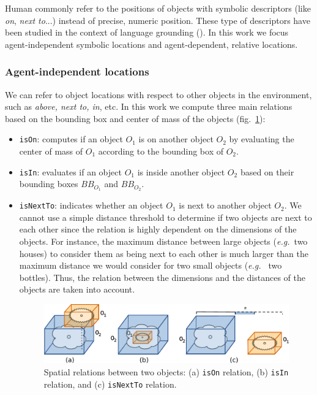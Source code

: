 \documentclass{svmult}
\newcommand{\concept}[1]{{\footnotesize \texttt{#1}}}
\newcommand{\eg}{{\textit{e.g.~}}}
\begin{document}
Human commonly refer to the positions of objects with symbolic descriptors
(like \emph{on}, \emph{next to}...) instead of precise, numeric position. These
type of descriptors have been studied in the context of language grounding
(\cite{O'Keefe1999,Matuszek2010,Regier2001,Kelleher2006,Blisard2005}). In this
work we focus agent-independent symbolic locations and agent-dependent,
relative locations.

\subsubsection{Agent-independent locations}

We can refer to object locations with respect to other objects in the
environment, such as \emph{above, next to, in}, etc. In this work we compute
three main relations based on the bounding box and center of mass of the
objects (fig.~\ref{fig|sprelations}): 

\begin{itemize}
	\item \concept{isOn}: computes if an object $O_1$ is on another object $O_2$ by
	evaluating the center of mass of $O_1$ according to the bounding box of $O_2$.

	\item \concept{isIn}: evaluates if an object $O_1$ is inside another object
	$O_2$ based on their bounding boxes $BB_{O_1}$ and $BB_{O_2}$.

	\item \concept{isNextTo}: indicates whether an object $O_1$ is next to another
	object $O_2$. We cannot use a simple distance threshold to determine if two
	objects are next to each other since the relation is highly dependent on the
	dimensions of the objects. For instance, the maximum distance between large
	objects (\eg two houses) to consider them as being next to each other is much
	larger than the maximum distance we would consider for two small objects (\eg
	two bottles). Thus, the relation between the dimensions and the distances of
	the objects are taken into account.  

\begin{figure} 
	\centering
	\includegraphics[width=0.95\columnwidth]{figs/spatial_relation.pdf}
	\caption{Spatial relations between two objects: (a) \concept{isOn} relation, 
	(b) \concept{isIn} relation, and (c) \concept{isNextTo} relation.} 
	\label{fig|sprelations} 
\end{figure}

\end{itemize} 
\end{document}
